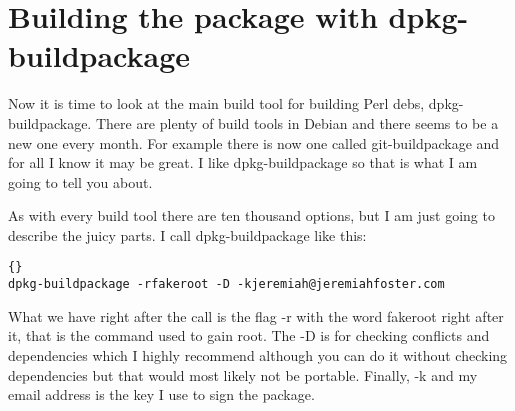 \section{Building the package with dpkg-buildpackage}
\label{s:debs_cpan:building}

Now it is time to look at the main build tool for building Perl debs,
dpkg-buildpackage. There are plenty of build tools in Debian and there seems to
be a new one every month. For example there is now one called git-buildpackage
and for all I know it may be great. I like dpkg-buildpackage so that is what I
am going to tell you about.

As with every build tool there are ten thousand options, but I am just going to
describe the juicy parts. I call dpkg-buildpackage like this:

\begin{lstlisting}[frame=trbl,label=cl:debs_cpan:dpkg-buildpackage,caption=dpkg-buildpackage command]{}
dpkg-buildpackage -rfakeroot -D -kjeremiah@jeremiahfoster.com
\end{lstlisting}

What we have right after the call is the f\hbox{}lag -r with the word fakeroot right
after it, that is the command used to gain root. The -D is for checking
conf\hbox{}licts and dependencies which I highly recommend although you can do it
without checking dependencies but that would most likely not be portable.
F\hbox{}inally, -k and my email address is the key I use to sign the package.

